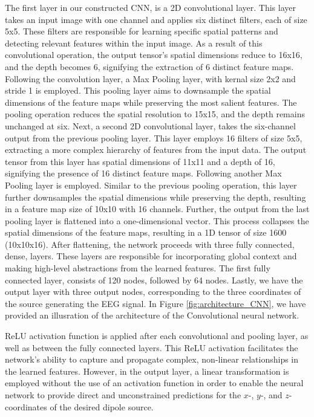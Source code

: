 \documentclass[a4paper, UKenglish, 11pt]{uiomaster}
\begin{document}
The first layer in our constructed CNN, is a 2D convolutional layer. This layer takes an input image with one channel and applies six distinct filters, each of size 5x5. These filters are responsible for learning specific spatial patterns and detecting relevant features within the input image. As a result of this convolutional operation, the output tensor's spatial dimensions reduce to 16x16, and the depth becomes 6, signifying the extraction of 6 distinct feature maps. Following the convolution layer, a Max Pooling layer, with kernal size 2x2 and stride 1 is employed. This pooling layer aims to downsample the spatial dimensions of the feature maps while preserving the most salient features. The pooling operation reduces the spatial resolution to 15x15, and the depth remains unchanged at six. Next, a second 2D convolutional layer, takes the six-channel output from the previous pooling layer. This layer employs 16 filters of size 5x5, extracting a more complex hierarchy of features from the input data. The output tensor from this layer has spatial dimensions of 11x11 and a depth of 16, signifying the presence of 16 distinct feature maps. Following another Max Pooling layer is employed. Similar to the previous pooling operation, this layer further downsamples the spatial dimensions while preserving the depth, resulting in a feature map size of 10x10 with 16 channels. Further, the output from the last pooling layer is flattened into a one-dimensional vector. This process collapses the spatial dimensions of the feature maps, resulting in a 1D tensor of size 1600 (10x10x16). After flattening, the network proceeds with three fully connected, dense, layers. These layers are responsible for incorporating global context and making high-level abstractions from the learned features. The first fully connected layer, consists of 120 nodes, followed by 64 nodes. Lastly, we have the output layer with three output nodes, corresponding to the three coordinates of the source generating the EEG signal. In Figure \ref{fig:architecture_CNN}, we have provided an illusration of the architecture of the Convolutional neural network.

ReLU activation function is applied after each convolutional and pooling layer, as well as between the fully connected layers. This ReLU activation facilitates the network's ability to capture and propagate complex, non-linear relationships in the learned features. However, in the output layer, a linear transformation is employed without the use of an activation function in order to enable the neural network to provide direct and unconstrained predictions for the $x$-, $y$-, and $z$-coordinates of the desired dipole source.
\end{document}
